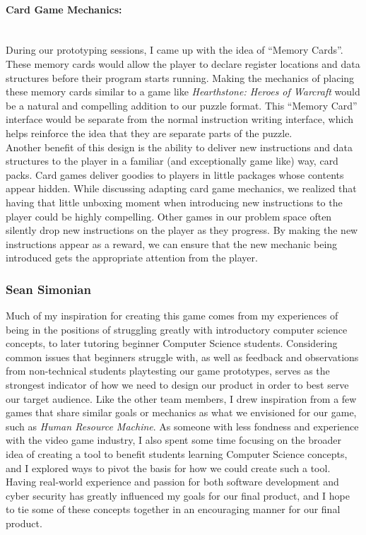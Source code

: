 \paragraph{Card Game Mechanics:} ~\\
During our prototyping sessions, I came up with the idea of “Memory Cards”.
These memory cards would allow the player to declare register locations and data
structures before their program starts running. Making the mechanics of placing these
memory cards similar to a game like \textit{Hearthstone: Heroes of Warcraft} would be
a natural and compelling addition to our puzzle format. This “Memory Card” interface
would be separate from the normal instruction writing interface, which helps reinforce
the idea that they are separate parts of the puzzle. \\

Another benefit of this design is the ability to deliver new instructions and data structures
to the player in a familiar (and exceptionally game like) way, card packs. Card games deliver
goodies to players in little packages whose contents appear hidden. While discussing adapting
card game mechanics, we realized that having that little unboxing moment when introducing new
instructions to the player could be highly compelling. Other games in our problem space often
silently drop new instructions on the player as they progress. By making the new instructions
appear as a reward, we can ensure that the new mechanic being introduced gets the appropriate
attention from the player. \\

\subsubsection{Sean Simonian}
Much of my inspiration for creating this game comes from my experiences of being in the positions 
of struggling greatly with introductory computer science concepts, to later tutoring beginner 
Computer Science students. Considering common issues that beginners struggle with, as well as 
feedback and observations from non-technical students playtesting our game prototypes, serves 
as the strongest indicator of how we need to design our product in order to best serve our target 
audience. Like the other team members, I drew inspiration from a few games that share similar goals 
or mechanics as what we envisioned for our game, such as \textit{Human Resource Machine}. As 
someone with less fondness and experience with the video game industry, I also spent some time 
focusing on the broader idea of creating a tool to benefit students learning Computer Science concepts,
 and I explored ways to pivot the basis for how we could create such a tool. Having real-world 
experience and passion for both software development and cyber security has greatly influenced my 
goals for our final product, and I hope to tie some of these concepts together in an encouraging 
manner for our final product.\\

